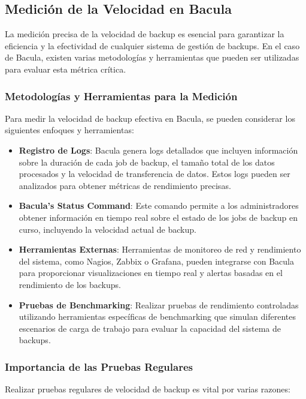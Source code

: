 \subsection{Medición de la Velocidad en Bacula}

La medición precisa de la velocidad de backup es esencial para garantizar la eficiencia y la efectividad de cualquier sistema de gestión de backups. En el caso de Bacula, existen varias metodologías y herramientas que pueden ser utilizadas para evaluar esta métrica crítica.

\subsubsection{Metodologías y Herramientas para la Medición}

Para medir la velocidad de backup efectiva en Bacula, se pueden considerar los siguientes enfoques y herramientas:

\begin{itemize}
    \item \textbf{Registro de Logs}: Bacula genera logs detallados que incluyen información sobre la duración de cada job de backup, el tamaño total de los datos procesados y la velocidad de transferencia de datos. Estos logs pueden ser analizados para obtener métricas de rendimiento precisas.
    \item \textbf{Bacula's Status Command}: Este comando permite a los administradores obtener información en tiempo real sobre el estado de los jobs de backup en curso, incluyendo la velocidad actual de backup.
    \item \textbf{Herramientas Externas}: Herramientas de monitoreo de red y rendimiento del sistema, como Nagios, Zabbix o Grafana, pueden integrarse con Bacula para proporcionar visualizaciones en tiempo real y alertas basadas en el rendimiento de los backups.
    \item \textbf{Pruebas de Benchmarking}: Realizar pruebas de rendimiento controladas utilizando herramientas específicas de benchmarking que simulan diferentes escenarios de carga de trabajo para evaluar la capacidad del sistema de backups.
\end{itemize}

\subsubsection{Importancia de las Pruebas Regulares}

Realizar pruebas regulares de velocidad de backup es vital por varias razones:

